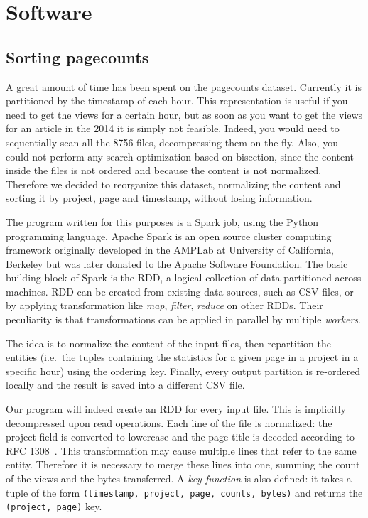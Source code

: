 \section{Software}
\label{sec:software}
\subsection{Sorting pagecounts}
\label{sub:Sorting pagecounts}
A great amount of time has been spent on the pagecounts dataset.
Currently it is partitioned by the timestamp of each hour.
This representation is useful if you need to get the views for a certain hour, but as soon as you want to get the views for an article in the 2014 it is simply not feasible.
Indeed, you would need to sequentially scan all the 8756 files, decompressing them on the fly.
Also, you could not perform any search optimization based on bisection, since the content inside the files is not ordered and because the content is not normalized.
Therefore we decided to reorganize this dataset, normalizing the content and sorting it by project, page and timestamp, without losing information.

The program written for this purposes is a Spark job, using the Python programming language.
Apache Spark is an open source cluster computing framework originally developed in the AMPLab at University of California, Berkeley but was later donated to the Apache Software Foundation.
The basic building block of Spark is the \ac{RDD}, a logical collection of data partitioned across machines.
\ac{RDD} can be created from existing data sources, such as \ac{CSV} files, or by applying transformation like \emph{map}, \emph{filter}, \emph{reduce} on other \acp{RDD}.
Their peculiarity is that transformations can be applied in parallel by multiple \emph{workers}.

The idea is to normalize the content of the input files, then repartition the entities (i.e.\ the tuples containing the statistics for a given page in a project in a specific hour) using the ordering key.
Finally, every output partition is re-ordered locally and the result is saved into a different CSV file.

Our program will indeed create an \ac{RDD} for every input file.
This is implicitly decompressed upon read operations.
Each line of the file is normalized: the project field is converted to lowercase and the page title is decoded according to RFC 1308~\cite{rfc1808}.
This transformation may cause multiple lines that refer to the same entity.
Therefore it is necessary to merge these lines into one, summing the count of the views and the bytes transferred.
A \emph{key function} is also defined: it takes a tuple of the form \texttt{(timestamp, project, page, counts, bytes)} and returns the \texttt{(project, page)} key.

